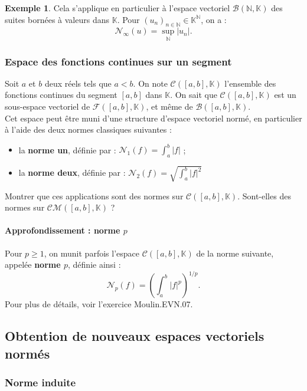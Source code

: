 \documentclass[french]{article}
\newcommand{\N}{\mathbb{N}}
\newcommand{\K}{\mathbb{K}}
\theoremstyle{plain}
\theoremstyle{definition}
\newtheorem*{ex}{Exemple}
\theoremstyle{remark}
\begin{document}
\begin{ex}
	Cela s'applique en particulier à l'espace vectoriel $\mathcal{B}(\N,\K)$ des suites bornées à valeurs dans $\K$. Pour $(u_n)_{n\in\N}\in\K^\N$, on a : $$\mathcal{N}_\infty(u)=\underset{\N}{\sup}\lvert u_n\rvert.$$
\end{ex}

\subsubsection*{Espace des fonctions continues sur un segment}

Soit $a$ et $b$ deux réels tels que $a<b$. On note $\mathcal{C}([a,b],\K)$ l'ensemble des fonctions continues du segment $[a,b]$ dans $\K$. On sait que $\mathcal{C}([a,b],\K)$ est un sous-espace vectoriel de $\mathcal{F}([a,b],\K)$, et même de $\mathcal{B}([a,b],\K)$.\\
Cet espace peut être muni d'une structure d'espace vectoriel normé, en particulier à l'aide des deux normes classiques suivantes :
\begin{itemize}
	\item la \textbf{norme un}, définie par : $\mathcal{N}_1(f)=\displaystyle\int_{a}^{b}\lvert f\rvert$ ;
	\item la \textbf{norme deux}, définie par : $\mathcal{N}_2(f)=\displaystyle\sqrt{\int_{a}^{b}\lvert f\rvert^2}$
\end{itemize}

\begin{exo}
	Montrer que ces applications sont des normes sur $\mathcal{C}([a,b],\K)$. Sont-elles des normes sur $\mathcal{CM}([a,b],\K)$ ?
\end{exo}

\paragraph{Approfondissement : norme $p$} Pour $p\geqslant 1$, on munit parfois l'espace $\mathcal{C}([a,b],\K)$ de la norme suivante, appelée \textbf{norme $p$}, définie ainsi : $$\mathcal{N}_p(f)=\left(\int_{a}^{b}\lvert f\rvert^p\right)^{1/p}.$$
Pour plus de détails, voir l'exercice Moulin.EVN.07.

\subsection{Obtention de nouveaux espaces vectoriels normés}

\subsubsection*{Norme induite}
\end{document}
